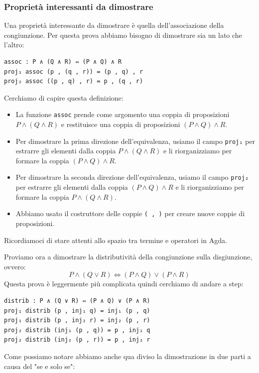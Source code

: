 \documentclass[a4paper]{article}
\theoremstyle{definition}
\theoremstyle{remark}
\begin{document}
\subsubsection{Proprietà interessanti da dimostrare}

Una proprietà interessante da dimostrare è quella dell'associazione della congiunzione.
Per questa prova abbiamo bisogno di dimostrare sia un lato che l'altro:
\begin{verbatim}
assoc : P ∧ (Q ∧ R) ⇔ (P ∧ Q) ∧ R
proj₁ assoc (p , (q , r)) = (p , q) , r
proj₂ assoc ((p , q) , r) = p , (q , r)
\end{verbatim}
Cerchiamo di capire questa definizione:
\begin{itemize}
  \item La funzione \texttt{assoc} prende come argomento una coppia di proposizioni \( P ∧ (Q ∧ R) \) e restituisce una coppia di proposizioni \( (P ∧ Q) ∧ R \).
  \item Per dimostrare la prima direzione dell'equivalenza, usiamo il campo \texttt{proj₁} per estrarre gli elementi dalla coppia \( P ∧ (Q ∧ R) \) e li riorganizziamo per formare la coppia \( (P ∧ Q) ∧ R \).
  \item Per dimostrare la seconda direzione dell'equivalenza, usiamo il campo \texttt{proj₂} per estrarre gli elementi dalla coppia \( (P ∧ Q) ∧ R \) e li riorganizziamo per formare la coppia \( P ∧ (Q ∧ R) \).
  \item Abbiamo usato il costruttore delle coppie \texttt{( , )} per creare nuove coppie di proposizioni.
\end{itemize}
\begin{Observation}{}{}{}
Ricordiamoci di stare attenti allo spazio tra termine e operatori in Agda.
\end{Observation}
Proviamo ora a dimostrare la distributività della congiunzione sulla disgiunzione, ovvero:
\[P ∧ (Q ∨ R) ⇔ (P ∧ Q) ∨ (P ∧ R)\]
Questa prova è leggermente più complicata quindi cerchiamo di andare a step:
\begin{verbatim}
distrib : P ∧ (Q ∨ R) ⇔ (P ∧ Q) ∨ (P ∧ R)
proj₁ distrib (p , inj₁ q) = inj₁ (p , q) 
proj₁ distrib (p , inj₂ r) = inj₂ (p , r)
proj₂ distrib (inj₁ (p , q)) = p , inj₁ q
proj₂ distrib (inj₂ (p , r)) = p , inj₂ r
\end{verbatim}
Come possiamo notare abbiamo anche qua diviso la dimostrazione in due parti a causa del "se e solo se": 
\end{document}
